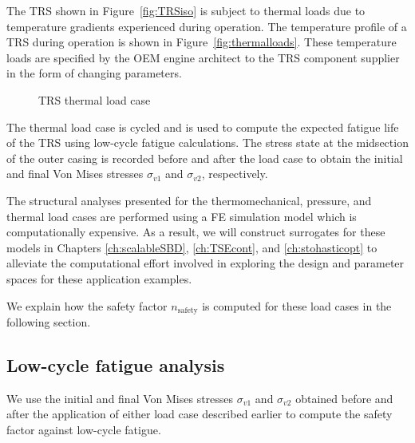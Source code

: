 The \ac{TRS} shown in Figure~\ref{fig:TRSiso} is subject to thermal loads due to temperature gradients experienced during operation. The temperature profile of a \ac{TRS} during operation is shown in Figure~\ref{fig:thermalloads}. These temperature loads are specified by the \ac{OEM} engine architect to the \ac{TRS} component supplier in the form of changing parameters.

\begin{figure}[h!]
	\centering
	 \hspace{0.1\textwidth}%
	\caption{\ac{TRS} thermal load case}
	\label{fig:thermalloadcases}
\end{figure}

The thermal load case is cycled and is used to compute the expected fatigue life of the \ac{TRS} using low-cycle fatigue calculations. The stress state at the midsection of the outer casing is recorded before and after the load case to obtain the initial and final Von Mises stresses $\sigma_{v1}$ and $\sigma_{v2}$, respectively.

The structural analyses presented for the thermomechanical, pressure, and thermal load cases are performed using a \ac{FE} simulation model which is computationally expensive. As a result, we will construct surrogates for these models in Chapters \ref{ch:scalableSBD}, \ref{ch:TSEcont}, and \ref{ch:stohasticopt} to alleviate the computational effort involved in exploring the design and parameter spaces for these application examples.

We explain how the safety factor $n_{\textrm{safety}}$ is computed for these load cases in the following section.

\subsection{Low-cycle fatigue analysis} \label{subsec:fatigueanalysis}

We use the initial and final Von Mises stresses $\sigma_{v1}$ and $\sigma_{v2}$ obtained before and after the application of either load case described earlier to compute the safety factor against low-cycle fatigue.

